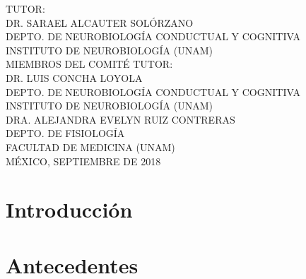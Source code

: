 \documentclass[12pt,spanish]{article}
\begin{document}
\begin{titlepage}
\begin{center}
TUTOR:\\
DR. SARAEL ALCAUTER SOLÓRZANO\\
DEPTO. DE NEUROBIOLOGÍA CONDUCTUAL Y COGNITIVA\\
INSTITUTO DE NEUROBIOLOGÍA (UNAM)\\[0.70cm]

MIEMBROS DEL COMITÉ TUTOR:\\
DR. LUIS CONCHA LOYOLA\\
DEPTO. DE NEUROBIOLOGÍA CONDUCTUAL Y COGNITIVA\\
INSTITUTO DE NEUROBIOLOGÍA (UNAM)\\[0.50cm]

DRA. ALEJANDRA EVELYN RUIZ CONTRERAS\\
DEPTO. DE FISIOLOGÍA\\
FACULTAD DE MEDICINA (UNAM)\\[0.70cm]

MÉXICO, SEPTIEMBRE DE 2018
\end{center}

\end{titlepage}

\newpage
\tableofcontents %

\newpage
\section{Introducción}

\lipsum[1-1]

\section{Antecedentes}

\lipsum[2-4] \citep{gracia2016asi}

\newpage

\end{document}
